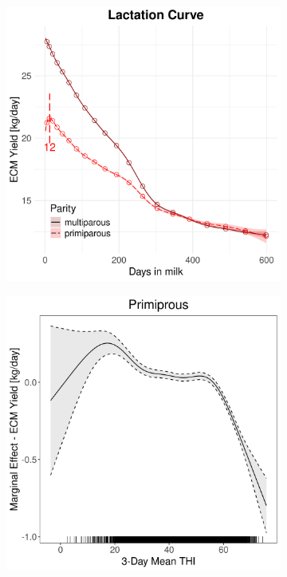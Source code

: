 \begin{figure}[H]
\begin{subfigure}[b]{0.45\textwidth}
        \includegraphics[width=\textwidth]{thesis/figures/models/ecm/before2010/ob_ecm_before2010/ob_ecm_before2010_marginal_dim_milk_combined.png}
    \end{subfigure}
    \begin{subfigure}[b]{0.45\textwidth}
        \centering
        \includegraphics[width=\textwidth]{thesis/figures/models/ecm/before2010/ob_ecm_before2010/ob_ecm_before2010_marginal_thi_milk_primi.png}

\end{subfigure}
\end{figure}
